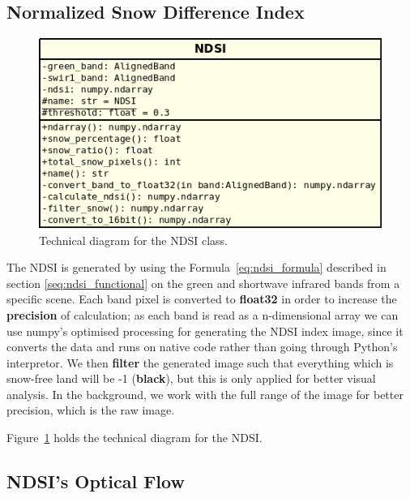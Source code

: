 \documentclass[12pt, a4paper]{report}
\begin{document}
	\subsection{Normalized Snow Difference Index}
	\label{seq:ndsi_implementation}
	
	\begin{figure}[h!]
		\centering
		\includegraphics[scale=0.6]{../images/ndsi_diagram.png}
		\caption{Technical diagram for the NDSI class.}
		\label{fig:ndsi_diagram}
	\end{figure}

	\par The NDSI is generated by using the Formula~\ref{eq:ndsi_formula} described in section \ref{seq:ndsi_functional} on the green and shortwave infrared bands from a specific scene. Each band pixel is converted to \textbf{float32} in order to increase the \textbf{precision} of calculation; as each band is read as a n-dimensional array we can use numpy's optimised processing for generating the NDSI index image, since it converts the data and runs on native code rather than going through Python's interpretor. We then \textbf{filter} the generated image such that everything which is snow-free land will be -1 (\textbf{black}), but this is only applied for better visual analysis. In the background, we work with the full range of the image for better precision, which is the raw image. 
	\par Figure~\ref{fig:ndsi_diagram} holds the technical diagram for the NDSI.


	\subsection{NDSI's Optical Flow}
	
\end{document}
